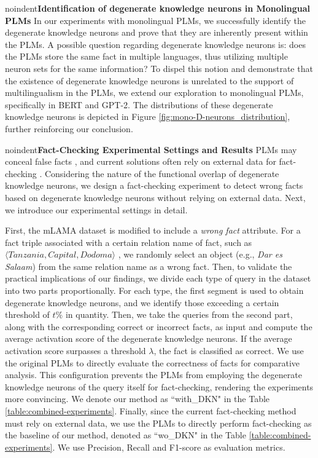 \documentclass[]{article}
\newcommand{\vpara}[1]{noindent\textbf{#1 }}%
\begin{document}
\vpara{Identification of degenerate knowledge neurons in Monolingual PLMs}
In our experiments with monolingual PLMs, we successfully identify the degenerate knowledge neurons and prove that they are inherently present within the PLMs.
A possible question regarding degenerate knowledge neurons is: does the PLMs store the same fact in multiple languages, thus utilizing multiple neuron sets for the same information? To dispel this notion and demonstrate that the existence of degenerate knowledge neurons is unrelated to the support of multilingualism in the PLMs, we extend our exploration to monolingual PLMs, specifically in BERT and GPT-2. The distributions of these degenerate knowledge neurons is depicted in Figure \ref{fig:mono-D-neurons_distribution}, further reinforcing our conclusion.

\vpara{Fact-Checking Experimental Settings and Results}
PLMs may conceal false facts \cite{hallucination_chatgpt1,hallucination_chatgpt2}, and current solutions often rely on external data for fact-checking \cite{fact-checking-survey}.
Considering the nature of the functional overlap of degenerate knowledge neurons, we design a fact-checking experiment to detect wrong facts based on degenerate knowledge neurons without relying on external data. Next, we introduce our experimental settings in detail.

 First, the mLAMA dataset is modified to include a \textit{wrong fact} attribute.
 For a fact triple associated with a certain relation name of fact, such as $\langle \textit{Tanzania}, \textit{Capital}, \textit{Dodoma} \rangle$ , we randomly select an object (e.g., \textit{Dar es Salaam}) from the same relation name as a wrong fact.
Then, to validate the practical implications of our findings, we divide each type of query in the dataset into two parts proportionally. For each type, the first segment is used to obtain degenerate knowledge neurons, and we identify those exceeding a certain threshold of \( t\% \) in quantity.
Then, we take the queries from the second part, along with the corresponding correct or incorrect facts, as input and compute the average activation score of the degenerate knowledge neurons. If the average activation score surpasses a threshold $\lambda$, the fact is classified as correct.
We use the original PLMs to directly evaluate the correctness of facts for comparative analysis. This configuration prevents the PLMs from employing the degenerate knowledge neurons of the query itself for fact-checking, rendering the experiments more convincing. We denote our method as ``with\_DKN" in the Table \ref{table:combined-experiments}.
Finally, since the current fact-checking method must rely on external data, we use the PLMs to directly perform fact-checking as the baseline of our method, denoted as ``wo\_DKN" in the Table \ref{table:combined-experiments}. We use Precision, Recall and F1-score as evaluation metrics.
\end{document}
